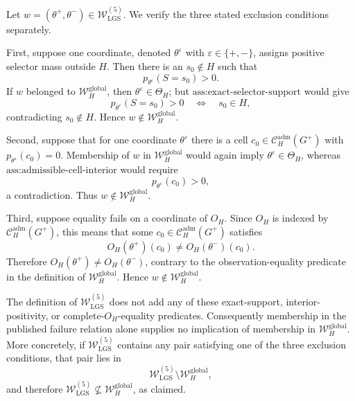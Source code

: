 Let \(w=(\theta^+,\theta^-)\in\mathcal W_{\mathrm{LGS}}^{(5)}\).  We verify the three stated exclusion conditions separately.

First, suppose one coordinate, denoted \(\theta^\varepsilon\) with \(\varepsilon\in\{+,-\}\), assigns positive selector mass outside \(H\).  Then there is an \(s_0\notin H\) such that
\[
p_{\theta^\varepsilon}(S=s_0)>0.
\]
If \(w\) belonged to \(\mathcal W_H^{\mathrm{global}}\), then \(\theta^\varepsilon\in\Theta_H\); but \(\text{ass:exact-selector-support}\) would give
\[
p_{\theta^\varepsilon}(S=s_0)>0
\quad\Longleftrightarrow\quad
s_0\in H,
\]
contradicting \(s_0\notin H\).  Hence \(w\notin\mathcal W_H^{\mathrm{global}}\).

Second, suppose that for one coordinate \(\theta^\varepsilon\) there is a cell \(c_0\in\mathcal C_H^{\mathrm{adm}}(G^+)\) with \(p_{\theta^\varepsilon}(c_0)=0\).  Membership of \(w\) in \(\mathcal W_H^{\mathrm{global}}\) would again imply \(\theta^\varepsilon\in\Theta_H\), whereas \(\text{ass:admissible-cell-interior}\) would require
\[
p_{\theta^\varepsilon}(c_0)>0,
\]
a contradiction.  Thus \(w\notin\mathcal W_H^{\mathrm{global}}\).

Third, suppose equality fails on a coordinate of \(O_H\).  Since \(O_H\) is indexed by \(\mathcal C_H^{\mathrm{adm}}(G^+)\), this means that some \(c_0\in\mathcal C_H^{\mathrm{adm}}(G^+)\) satisfies
\[
O_H(\theta^+)(c_0)\ne O_H(\theta^-)(c_0).
\]
Therefore \(O_H(\theta^+)\ne O_H(\theta^-)\), contrary to the observation-equality predicate in the definition of \(\mathcal W_H^{\mathrm{global}}\).  Hence \(w\notin\mathcal W_H^{\mathrm{global}}\).

The definition of \(\mathcal W_{\mathrm{LGS}}^{(5)}\) does not add any of these exact-support, interior-positivity, or complete-\(O_H\)-equality predicates.  Consequently membership in the published failure relation alone supplies no implication of membership in \(\mathcal W_H^{\mathrm{global}}\).  More concretely, if \(\mathcal W_{\mathrm{LGS}}^{(5)}\) contains any pair satisfying one of the three exclusion conditions, that pair lies in
\[
\mathcal W_{\mathrm{LGS}}^{(5)}\setminus\mathcal W_H^{\mathrm{global}},
\]
and therefore \(\mathcal W_{\mathrm{LGS}}^{(5)}\not\subseteq\mathcal W_H^{\mathrm{global}}\), as claimed.
